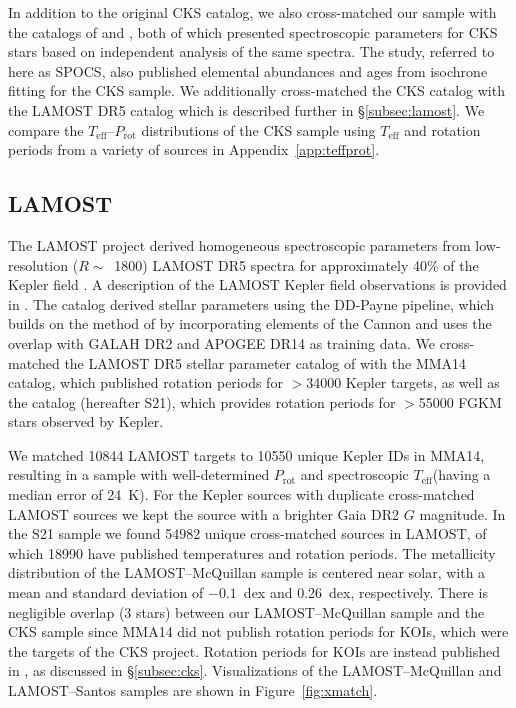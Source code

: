 \documentclass[trackchanges,twocolumn]{aastex631}
\newcommand{\lamostmcq}{LAMOST--McQuillan\xspace}
\newcommand{\lamostsan}{LAMOST--Santos\xspace}
\newcommand{\mma}{MMA14\xspace}
\newcommand{\santos}{S21\xspace}
\newcommand{\teff}{\ensuremath{T_{\mathrm{eff}}}\xspace}
\newcommand{\prot}{\ensuremath{P_\mathrm{rot}}\xspace}
\begin{document}
In addition to the original CKS catalog, we also cross-matched our sample with the catalogs of \citet{Brewer2018} and \citet{Martinez2019}, both of which presented spectroscopic parameters for CKS stars based on independent analysis of the same spectra. The \citet{Brewer2018} study, referred to here as SPOCS, also published elemental abundances and ages from isochrone fitting for the CKS sample. We additionally cross-matched the CKS catalog with the LAMOST DR5 catalog \citep{Xiang2019} which is described further in \S\ref{subsec:lamost}. We compare the \teff--\prot distributions of the CKS sample using \teff and rotation periods from a variety of sources in Appendix~\ref{app:teffprot}.

\subsection{LAMOST \label{subsec:lamost}}
The LAMOST project derived homogeneous spectroscopic parameters from low-resolution ($R\sim$~1800) LAMOST DR5 spectra for approximately 40\% of the Kepler field \citep{Zong2018, Xiang2019}. A description of the LAMOST Kepler field observations is provided in \citet{deCat2015}. The \citet{Xiang2019} catalog derived stellar parameters using the DD-Payne pipeline, which builds on the method of \citet{Ting2017b} by incorporating elements of the Cannon \citep{Ness2015} and uses the overlap with GALAH DR2 and APOGEE DR14 as training data. We cross-matched the LAMOST DR5 stellar parameter catalog of \citet{Xiang2019} with the \mma catalog, which published rotation periods for $>$34000 Kepler targets, as well as the \citet{Santos2021} catalog (hereafter S21), which provides rotation periods for $>$55000 FGKM stars observed by Kepler.

We matched 10844 LAMOST targets to 10550 unique Kepler IDs in \mma, resulting in a sample with well-determined \prot and spectroscopic \teff (having a median error of 24~K). For the Kepler sources with duplicate cross-matched LAMOST sources we kept the source with a brighter Gaia DR2 $G$ magnitude. In the \santos sample we found 54982 unique cross-matched sources in LAMOST, of which 18990 have published temperatures and rotation periods. The metallicity distribution of the LAMOST--McQuillan sample is centered near solar, with a mean and standard deviation of $-0.1$~dex and 0.26~dex, respectively. There is negligible overlap (3 stars) between our LAMOST--McQuillan sample and the CKS sample since \mma did not publish rotation periods for KOIs, which were the targets of the CKS project. Rotation periods for KOIs are instead published in \citet{McQuillan2013}, as discussed in \S\ref{subsec:cks}. Visualizations of the \lamostmcq and \lamostsan samples are shown in Figure~\ref{fig:xmatch}.
\end{document}
